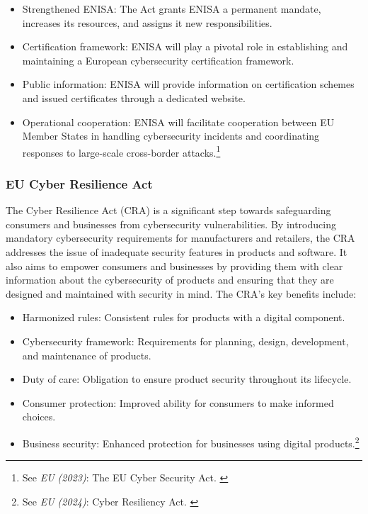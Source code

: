 \begin{itemize}
    \item Strengthened ENISA: The Act grants ENISA a permanent mandate, increases its resources, and assigns it new responsibilities.
    \item Certification framework: ENISA will play a pivotal role in establishing and maintaining a European cybersecurity certification framework.
    \item Public information: ENISA will provide information on certification schemes and issued certificates through a dedicated website.
    \item Operational cooperation: ENISA will facilitate cooperation between EU Member States in handling cybersecurity incidents and coordinating responses to large-scale cross-border attacks.\footnote{See \textit{EU (2023)}: The EU Cyber Security Act. \cite{cyberSec}}
\end{itemize}

\subsubsection{EU Cyber Resilience Act}

The Cyber Resilience Act (CRA) is a significant step towards safeguarding consumers and businesses from cybersecurity vulnerabilities. By introducing mandatory cybersecurity requirements for manufacturers and retailers, the CRA addresses the issue of inadequate security features in products and software. It also aims to empower consumers and businesses by providing them with clear information about the cybersecurity of products and ensuring that they are designed and maintained with security in mind. The CRA's key benefits include:

\begin{itemize}
    \item Harmonized rules: Consistent rules for products with a digital component.
    \item Cybersecurity framework: Requirements for planning, design, development, and maintenance of products.
    \item Duty of care: Obligation to ensure product security throughout its lifecycle.
    \item Consumer protection: Improved ability for consumers to make informed choices.
    \item Business security: Enhanced protection for businesses using digital products.\footnote{See \textit{EU (2024)}: Cyber Resiliency Act. \cite{cyberResiliency}}
\end{itemize}

